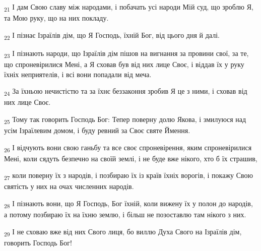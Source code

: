 \begin{tcolorbox}
\textsubscript{21} І дам Свою славу між народами, і побачать усі народи Мій суд, що зроблю Я, та Мою руку, що на них покладу.
\end{tcolorbox}
\begin{tcolorbox}
\textsubscript{22} І пізнає Ізраїлів дім, що Я Господь, їхній Бог, від цього дня й далі.
\end{tcolorbox}
\begin{tcolorbox}
\textsubscript{23} І пізнають народи, що Ізраїлів дім пішов на вигнання за провини свої, за те, що спроневірилися Мені, а Я сховав був від них лице Своє, і віддав їх у руку їхніх неприятелів, і всі вони попадали від меча.
\end{tcolorbox}
\begin{tcolorbox}
\textsubscript{24} За їхньою нечистістю та за їхнє беззаконня зробив Я це з ними, і сховав від них лице Своє.
\end{tcolorbox}
\begin{tcolorbox}
\textsubscript{25} Тому так говорить Господь Бог: Тепер поверну долю Якова, і змилуюся над усім Ізраїлевим домом, і буду ревний за Своє святе Ймення.
\end{tcolorbox}
\begin{tcolorbox}
\textsubscript{26} І відчують вони свою ганьбу та все своє спроневірення, яким спроневірилися Мені, коли сядуть безпечно на своїй землі, і не буде вже нікого, хто б їх страшив,
\end{tcolorbox}
\begin{tcolorbox}
\textsubscript{27} коли поверну їх з народів, і позбираю їх із країв їхніх ворогів, і покажу Свою святість у них на очах численних народів.
\end{tcolorbox}
\begin{tcolorbox}
\textsubscript{28} І пізнають вони, що Я Господь, Бог їхній, коли вижену їх у полон до народів, а потому позбираю їх на їхню землю, і більш не позоставлю там нікого з них.
\end{tcolorbox}
\begin{tcolorbox}
\textsubscript{29} І не сховаю вже від них Свого лиця, бо виллю Духа Свого на Ізраїлів дім, говорить Господь Бог!
\end{tcolorbox}
